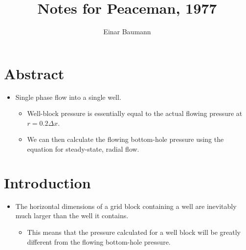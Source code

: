 

\author{Einar Baumann}
\title{Notes for Peaceman, 1977}


\maketitle

\section{Abstract} %
\label{sec:abstract}
\begin{itemize}
    \item Single phase flow into a single well.
    \begin{itemize}
        \item Well-block pressure is essentially equal to the actual flowing pressure at $r=0.2 \Delta x$.
        \item We can then calculate the flowing bottom-hole pressure using the equation for steady-state, radial flow.
    \end{itemize}
\end{itemize}

\section{Introduction} %
\label{sec:introduction}
\begin{itemize}
    \item The horizontal dimensions of a grid block containing a well are inevitably much larger than the well it contains.
    \begin{itemize}
        \item This means that the pressure calculated for a well block will be greatly different from the flowing bottom-hole pressure.
    \end{itemize}
\end{itemize}




